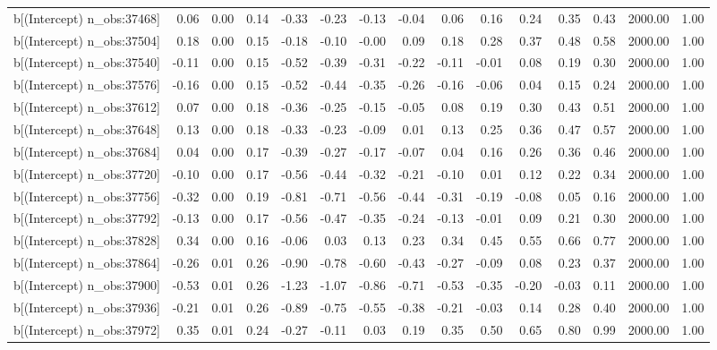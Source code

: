 \begin{table}[ht]
\begin{tabular}{rrrrrrrrrrrrrrr}
  b[(Intercept) n\_obs:37468] & 0.06 & 0.00 & 0.14 & -0.33 & -0.23 & -0.13 & -0.04 & 0.06 & 0.16 & 0.24 & 0.35 & 0.43 & 2000.00 & 1.00 \\ 
  b[(Intercept) n\_obs:37504] & 0.18 & 0.00 & 0.15 & -0.18 & -0.10 & -0.00 & 0.09 & 0.18 & 0.28 & 0.37 & 0.48 & 0.58 & 2000.00 & 1.00 \\ 
  b[(Intercept) n\_obs:37540] & -0.11 & 0.00 & 0.15 & -0.52 & -0.39 & -0.31 & -0.22 & -0.11 & -0.01 & 0.08 & 0.19 & 0.30 & 2000.00 & 1.00 \\ 
  b[(Intercept) n\_obs:37576] & -0.16 & 0.00 & 0.15 & -0.52 & -0.44 & -0.35 & -0.26 & -0.16 & -0.06 & 0.04 & 0.15 & 0.24 & 2000.00 & 1.00 \\ 
  b[(Intercept) n\_obs:37612] & 0.07 & 0.00 & 0.18 & -0.36 & -0.25 & -0.15 & -0.05 & 0.08 & 0.19 & 0.30 & 0.43 & 0.51 & 2000.00 & 1.00 \\ 
  b[(Intercept) n\_obs:37648] & 0.13 & 0.00 & 0.18 & -0.33 & -0.23 & -0.09 & 0.01 & 0.13 & 0.25 & 0.36 & 0.47 & 0.57 & 2000.00 & 1.00 \\ 
  b[(Intercept) n\_obs:37684] & 0.04 & 0.00 & 0.17 & -0.39 & -0.27 & -0.17 & -0.07 & 0.04 & 0.16 & 0.26 & 0.36 & 0.46 & 2000.00 & 1.00 \\ 
  b[(Intercept) n\_obs:37720] & -0.10 & 0.00 & 0.17 & -0.56 & -0.44 & -0.32 & -0.21 & -0.10 & 0.01 & 0.12 & 0.22 & 0.34 & 2000.00 & 1.00 \\ 
  b[(Intercept) n\_obs:37756] & -0.32 & 0.00 & 0.19 & -0.81 & -0.71 & -0.56 & -0.44 & -0.31 & -0.19 & -0.08 & 0.05 & 0.16 & 2000.00 & 1.00 \\ 
  b[(Intercept) n\_obs:37792] & -0.13 & 0.00 & 0.17 & -0.56 & -0.47 & -0.35 & -0.24 & -0.13 & -0.01 & 0.09 & 0.21 & 0.30 & 2000.00 & 1.00 \\ 
  b[(Intercept) n\_obs:37828] & 0.34 & 0.00 & 0.16 & -0.06 & 0.03 & 0.13 & 0.23 & 0.34 & 0.45 & 0.55 & 0.66 & 0.77 & 2000.00 & 1.00 \\ 
  b[(Intercept) n\_obs:37864] & -0.26 & 0.01 & 0.26 & -0.90 & -0.78 & -0.60 & -0.43 & -0.27 & -0.09 & 0.08 & 0.23 & 0.37 & 2000.00 & 1.00 \\ 
  b[(Intercept) n\_obs:37900] & -0.53 & 0.01 & 0.26 & -1.23 & -1.07 & -0.86 & -0.71 & -0.53 & -0.35 & -0.20 & -0.03 & 0.11 & 2000.00 & 1.00 \\ 
  b[(Intercept) n\_obs:37936] & -0.21 & 0.01 & 0.26 & -0.89 & -0.75 & -0.55 & -0.38 & -0.21 & -0.03 & 0.14 & 0.28 & 0.40 & 2000.00 & 1.00 \\ 
  b[(Intercept) n\_obs:37972] & 0.35 & 0.01 & 0.24 & -0.27 & -0.11 & 0.03 & 0.19 & 0.35 & 0.50 & 0.65 & 0.80 & 0.99 & 2000.00 & 1.00 \\ 

\end{tabular}
\end{table}
